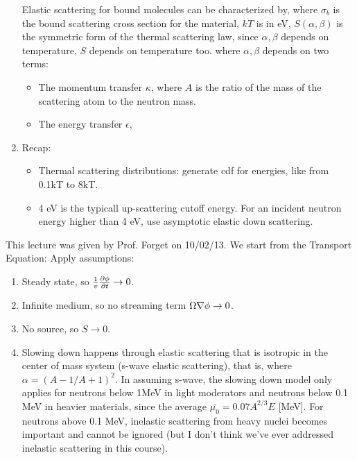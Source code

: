 \documentclass{school-22.211-notes}
\begin{document}
\begin{enumerate}
  Elastic scattering for bound molecules can be characterized by,
  where $\sigma_b$ is the bound scattering cross section for the material, $kT$ is in eV, $S(\alpha, \beta)$ is the symmetric form of the thermal scattering law, since $\alpha, \beta$ depends on temperature, $S$ depends on temperature too. 
  where $\alpha, \beta$ depends on two terms:
  \begin{itemize}
  \item The momentum transfer $\kappa$,
    where $A$ is the ratio of the mass of the scattering atom to the neutron mass.
  \item The energy transfer $\epsilon$,
  \end{itemize}

\item Recap: 
  \begin{itemize}
  \item Thermal scattering distributions: generate cdf for energies, like from 0.1kT to 8kT.  
  \item 4 eV is the typicall up-scattering cutoff energy. For an incident neutron energy higher than 4 eV, use asymptotic elastic down scattering. 
  \end{itemize}
\end{enumerate}


\clearpage
{} 
This lecture was given by Prof. Forget on 10/02/13. We start from the Transport Equation:
Apply assumptions:
\begin{enumerate}
\item Steady state, so $\frac{1}{v} \frac{\partial \phi}{\partial t} \to 0$. 
\item Infinite medium, so no streaming term $\Omega \nabla \phi \to 0$. 
\item No source, so $S \to 0$. 
\item Slowing down happens through elastic scattering that is isotropic in the center of mass system (s-wave elastic scattering), that is, 
  where $\alpha = (A-1/A+1)^2$. In assuming s-wave, the slowing down model only applies for neutrons below 1MeV in light moderators and neutrons below 0.1 MeV in heavier materials, since the average $\bar{\mu_0} = 0.07 A^{2/3}E$ [MeV].  For neutrons above 0.1 MeV, inelastic scattering from heavy nuclei becomes important and cannot be ignored (but I don't think we've ever addressed inelastic scattering in this course).
\end{enumerate}
\end{document}
